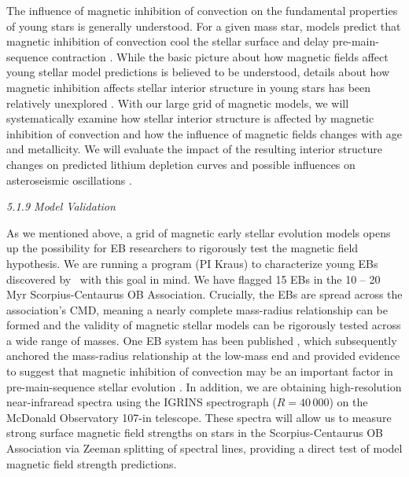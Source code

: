 The influence of magnetic inhibition of convection on the fundamental properties of young stars is generally understood. For a given mass star, models predict that magnetic inhibition of convection cool the stellar surface and delay pre-main-sequence contraction \citep{DAntona2000, MM10, Malo2014, Feiden2016}. While the basic picture about how magnetic fields affect young stellar model predictions is believed to be understood, details about how magnetic inhibition affects stellar interior structure in young stars  has been relatively unexplored \citep[e.g., on radiative core development;][]{Feiden2016}. With our large grid of magnetic models, we will systematically examine how stellar interior structure is affected by magnetic inhibition of convection and how the influence of magnetic fields changes with age and metallicity. We will evaluate the impact of the resulting interior structure changes on predicted lithium depletion curves \citep[see, e.g.,][]{Malo2014} and possible influences on asteroseismic oscillations \citep{Zwintz2014}.


{\it 5.1.9 Model Validation}

As we mentioned above, a grid of magnetic early stellar evolution models opens up the possibility for EB researchers to rigorously test the magnetic field hypothesis. We are running a program (PI Kraus) to characterize young EBs discovered by \kepler\ with this goal in mind. We have flagged 15 EBs in the 10 -- 20 Myr Scorpius-Centaurus OB Association. Crucially, the EBs are spread across the association's CMD, meaning a nearly complete mass-radius relationship can be formed and the validity of magnetic stellar models can be rigorously tested across a wide range of masses. One EB system has been published \citep[UScoCTIO 5;][]{Kraus2015}, which subsequently anchored the mass-radius relationship at the low-mass end and provided evidence to suggest that magnetic inhibition of convection may be an important factor in pre-main-sequence stellar evolution \citep{Feiden2016}. In addition, we are obtaining high-resolution near-infraread spectra using the IGRINS spectrograph ($R = 40\,000$) on the McDonald Observatory 107-in telescope. These spectra will allow us to measure strong surface magnetic field strengths on stars in the Scorpius-Centaurus OB Association via Zeeman splitting of spectral lines, providing a direct test of model magnetic field strength predictions.

